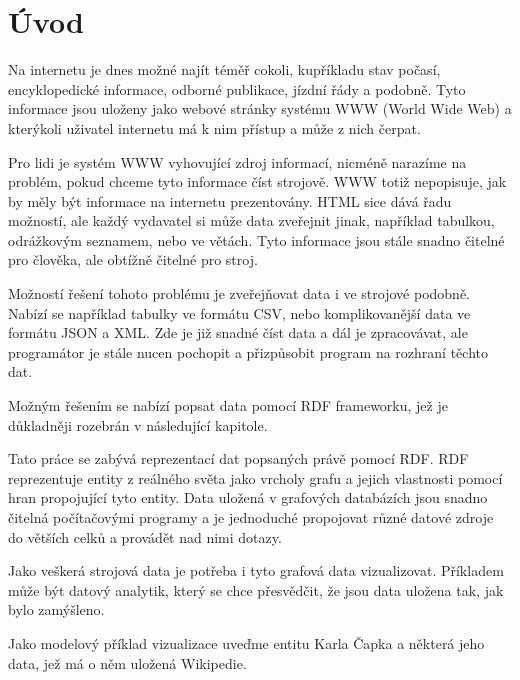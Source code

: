 \chapter*{Úvod}

Na internetu je dnes možné najít téměř cokoli, kupříkladu stav počasí, encyklopedické informace, odborné publikace, jízdní řády a podobně. Tyto informace jsou uloženy jako webové stránky systému WWW (World Wide Web) a kterýkoli uživatel internetu má k nim přístup a může z nich čerpat.

Pro lidi je systém WWW vyhovující zdroj informací, nicméně narazíme na problém, pokud chceme tyto informace číst strojově. WWW totiž nepopisuje, jak by měly být informace na internetu prezentovány. HTML sice dává řadu možností, ale každý vydavatel si může data zveřejnit jinak, například tabulkou, odrážkovým seznamem, nebo ve větách. Tyto informace jsou stále snadno čitelné pro člověka, ale obtížně čitelné pro stroj.

Možností řešení tohoto problému je zveřejňovat data i ve strojové podobně. Nabízí se například tabulky ve formátu CSV, nebo komplikovanější data ve formátu JSON a XML. Zde je již snadné číst data a dál je zpracovávat, ale programátor je stále nucen pochopit a přizpůsobit program na rozhraní těchto dat.

Možným řešením se nabízí popsat data pomocí RDF frameworku, jež je důkladněji rozebrán v následující kapitole.

\bigskip

Tato práce se zabývá reprezentací dat popsaných právě pomocí RDF. RDF reprezentuje entity z reálného světa jako vrcholy grafu a jejich vlastnosti pomocí hran propojující tyto entity. Data uložená v grafových databázích jsou snadno čitelná počítačovými programy a je jednoduché propojovat různé datové zdroje do větších celků a provádět nad nimi dotazy.

Jako veškerá strojová data je potřeba i tyto grafová data vizualizovat. Příkladem může být datový analytik, který se chce přesvědčit, že jsou data uložena tak, jak bylo zamýšleno.

Jako modelový příklad vizualizace uveďme entitu Karla Čapka a některá jeho data, jež má o něm uložená Wikipedie.

